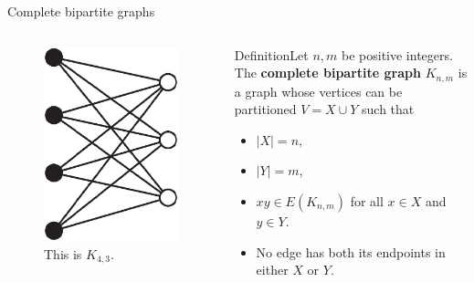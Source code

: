 \documentclass{beamer}
\def\bl[#1]#2{\begin{block}{#1}#2\end{block}}
\def\itemb{\begin{itemize}}
\def\iteme{\end{itemize}}
\begin{document}
\begin{frame}{Complete bipartite graphs}
\begin{columns}
\begin{figure}
\centering
\includegraphics[scale=0.25]{ComplBipart.jpg}
\caption{This is $K_{4,3}$.}
\end{figure}
\bl[Definition]{Let $n,m$ be positive integers. The \textbf{complete bipartite graph} $K_{n,m}$ is a graph whose vertices can be partitioned $V=X\cup Y$ such that
\itemb
\item $|X|=n$,
\item $|Y|=m$,
\item $xy\in E(K_{n,m})$ for all $x\in X$ and $y\in Y$.
\item No edge has both its endpoints in either $X$ or $Y$.
\iteme}
\end{columns}

\end{frame}
\end{document}
